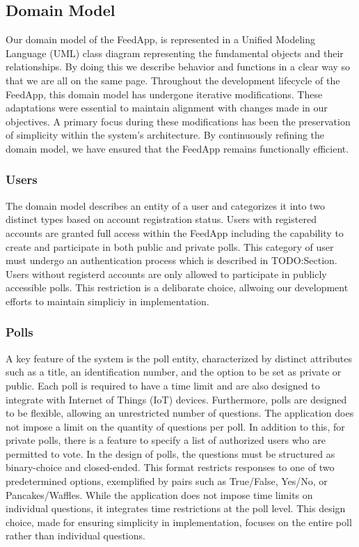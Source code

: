 \subsection{Domain Model} 

Our domain model of the FeedApp, is represented in a Unified Modeling Language (UML) class diagram representing the fundamental objects and their relationships. By doing this we describe  behavior and functions in a clear way so that we are all on the same page.  Throughout the development lifecycle of the FeedApp, this domain model has undergone iterative modifications. These adaptations were essential to maintain alignment with changes made in our objectives.  A primary focus during these modifications has been the preservation of simplicity within the system's architecture. By continuously refining the domain model, we have ensured that the FeedApp remains functionally efficient.

\subsubsection{Users}
The domain model describes an entity of a user and categorizes it into two distinct types based on account registration status.  Users with registered accounts are granted full access within the FeedApp including the capability to create and participate in both public and private polls.  This category of user must undergo an authentication process which is described in TODO:Section.  Users without registerd accounts are only allowed to participate in publicly accessible  polls.  This restriction is a delibarate choice, allwoing our development efforts to maintain simpliciy in implementation.  

\subsubsection{Polls}
A key feature of the system is the poll entity, characterized by distinct attributes such as a title, an identification number, and the option to be set as private or public. Each poll is required to have a time limit and are also designed to integrate with Internet of Things (IoT) devices.  Furthermore, polls are designed to be flexible, allowing an unrestricted number of questions. The application does not impose a limit on the quantity of questions per poll.  In addition to this, for private polls, there is a feature to specify a list of authorized users who are permitted to vote. 
In the design of polls, the questions must be structured as binary-choice and closed-ended.  This format restricts responses to one of two predetermined options, exemplified by pairs such as True/False, Yes/No, or Pancakes/Waffles.  While the application does not impose time limits on individual questions, it integrates time restrictions at the poll level.  This design choice, made for ensuring simplicity in implementation, focuses on the entire poll rather than individual questions.

